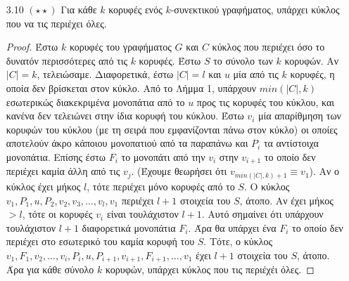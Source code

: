 \documentclass[a4paper, oneside, 11pt]{article}
\begin{document}
\begin{enumerate}
\begin{proof}
\begin{itemize}
               Έστω τώρα ότι $\{x, y\} \in E(G)$. Αν το γράφημα έχει μόνο
               3 κορυφές τότε είναι το $K_3$ και έχουμε τελειώσει.
               Διαφορετικά έστω ότι έχει τουλάχιστον άλλη μία κορυφή $w$
               η οποία συνδέεται στην $x$. Επειδή το γράφημα είναι δισυνεκτικό
               θα πρέπει η αφαίρεση της $x$ να μην το αποσυνδέει, συνεπώς
               θα πρέπει να υπάρχει μονοπάτι $P$ από την $w$ στην
               $y$ που να μην χρησιμοποιεί την κορυφή $x$. Tότε όμως
               μεταξύ της $x$ και της $y$ θα υπήραν 3 εσωτερικά διακεκριμένα
               μονοπάτια: 1) $(x, y)$, 2) $(x, u, y)$, 3) $P$. Άτοπο
               γιατί τώρα η αφαίρεση της $\{x, y\}$ διατηρεί το γράφημα
               δισυνεκτικό.\footnote{Υπάρχει περίπτωση το $P$ να χρησιμοποιεί
               την $u$ ώς ενδιάμεσο κόμβο. Σε αυτή την περίπτωση θεωρούμε
               το $P'$ από το $w$ στο $u$ και δείχνουμε ότι υπάρχουν
               3 εσωτερικά διακεκριμένα μονοπάτια από το $x$ στο $u$.}

               Άρα η $u$ είναι μη απλοϊδής κορυφή βαθμού 2 και μένει να
               δείξουμε ότι η διάλυσή της διατηρεί τη συνεκτικότητα. Αυτό
               προκύπτει από το θεώρημα Menger αφού ό,τι μονοπάτια υπήρχαν
               πριν μεταξύ κορυφών συνεχίζουν να υπάρχουν.
         \end{itemize}
      \end{proof}

   \item[3.10 $(\star\star)$]
Για κάθε $k$ κορυφές ενός $k$-συνεκτικού γραφήματος, υπάρχει κύκλος που να τις περιέχει όλες.
\begin{proof}
Έστω $k$ κορυφές του γραφήματος $G$ και $C$ κύκλος που περιέχει όσο το δυνατόν περισσότερες από τις $k$ κορυφές. Έστω $S$ το σύνολο των $k$ κορυφών. Αν $|C|=k$, τελειώσαμε. 
Διαφορετικά, έστω $|C|=l$ και $u$ μία από τις 
$k$ κορυφές, η οποία δεν 
βρίσκεται στον κύκλο. Από το Λήμμα 1, υπάρχουν $min(|C|,k)$ εσωτερικώς διακεκριμένα μονοπάτια από το $u$ προς τις κορυφές του κύκλου, και κανένα δεν τελειώνει στην ίδια κορυφή του κύκλου. Έστω $v_i$ μία
απαρίθμηση των κορυφών του κύκλου (με τη σειρά που εμφανίζονται πάνω στον κύκλο) οι οποίες αποτελούν άκρο κάποιου μονοπατιού από τα παραπάνω 
και $P_i$ τα αντίστοιχα μονοπάτια. Επίσης έστω $F_i$ το μονοπάτι από 
την $v_i$ στην $v_{i+1}$ το οποίο δεν περιέχει καμία άλλη από τις $v_j$. (Έχουμε θεωρήσει ότι $v_{min(|C|,k)+1}\equiv v_1$). Αν ο κύκλος έχει μήκος $l$, τότε περιέχει μόνο κορυφές από το $S$. Ο κύκλος
$v_1, P_1, u, P_2, v_2, v_3, ..., v_l, v_1$ περιέχει $l+1$ στοιχεία του $S$, άτοπο. Αν έχει μήκος $>l$, τότε οι κορυφές $v_i$ είναι τουλάχιστον $l+1$. Αυτό σημαίνει ότι υπάρχουν τουλάχιστον $l+1$
διαφορετικά μονοπάτια $F_i$. Άρα θα υπάρχει ένα $F_i$ το οποίο δεν περιέχει στο εσωτερικό του καμία κορυφή του $S$. Τότε, ο κύκλος $v_1, F_1, v_2, ..., v_i, P_i, u, P_{i+1}, v_{i+1}, F_{i+1}, ...,v_1$ 
έχει $l+1$ στοιχεία του $S$, άτοπο.
Άρα για κάθε σύνολο $k$ κορυφών, υπάρχει κύκλος που τις περιέχέι όλες.
\end{proof}


\end{enumerate}
\end{document}
